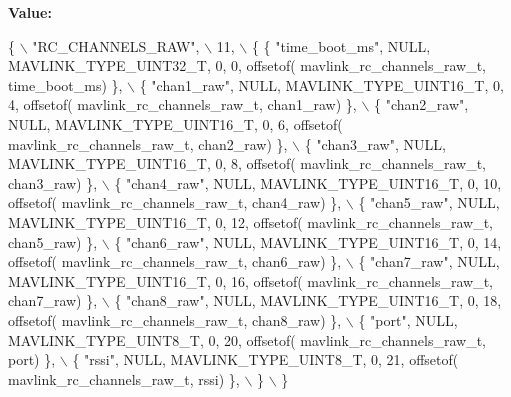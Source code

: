 {\bfseries Value\+:}
\begin{DoxyCode}
\{ \(\backslash\)
    \textcolor{stringliteral}{"RC\_CHANNELS\_RAW"}, \(\backslash\)
    11, \(\backslash\)
    \{  \{ \textcolor{stringliteral}{"time\_boot\_ms"}, NULL, MAVLINK_TYPE_UINT32_T, 0, 0, offsetof(
      mavlink_rc_channels_raw_t, time\_boot\_ms) \}, \(\backslash\)
         \{ \textcolor{stringliteral}{"chan1\_raw"}, NULL, MAVLINK_TYPE_UINT16_T, 0, 4, offsetof(
      mavlink_rc_channels_raw_t, chan1\_raw) \}, \(\backslash\)
         \{ \textcolor{stringliteral}{"chan2\_raw"}, NULL, MAVLINK_TYPE_UINT16_T, 0, 6, offsetof(
      mavlink_rc_channels_raw_t, chan2\_raw) \}, \(\backslash\)
         \{ \textcolor{stringliteral}{"chan3\_raw"}, NULL, MAVLINK_TYPE_UINT16_T, 0, 8, offsetof(
      mavlink_rc_channels_raw_t, chan3\_raw) \}, \(\backslash\)
         \{ \textcolor{stringliteral}{"chan4\_raw"}, NULL, MAVLINK_TYPE_UINT16_T, 0, 10, offsetof(
      mavlink_rc_channels_raw_t, chan4\_raw) \}, \(\backslash\)
         \{ \textcolor{stringliteral}{"chan5\_raw"}, NULL, MAVLINK_TYPE_UINT16_T, 0, 12, offsetof(
      mavlink_rc_channels_raw_t, chan5\_raw) \}, \(\backslash\)
         \{ \textcolor{stringliteral}{"chan6\_raw"}, NULL, MAVLINK_TYPE_UINT16_T, 0, 14, offsetof(
      mavlink_rc_channels_raw_t, chan6\_raw) \}, \(\backslash\)
         \{ \textcolor{stringliteral}{"chan7\_raw"}, NULL, MAVLINK_TYPE_UINT16_T, 0, 16, offsetof(
      mavlink_rc_channels_raw_t, chan7\_raw) \}, \(\backslash\)
         \{ \textcolor{stringliteral}{"chan8\_raw"}, NULL, MAVLINK_TYPE_UINT16_T, 0, 18, offsetof(
      mavlink_rc_channels_raw_t, chan8\_raw) \}, \(\backslash\)
         \{ \textcolor{stringliteral}{"port"}, NULL, MAVLINK_TYPE_UINT8_T, 0, 20, offsetof(
      mavlink_rc_channels_raw_t, port) \}, \(\backslash\)
         \{ \textcolor{stringliteral}{"rssi"}, NULL, MAVLINK_TYPE_UINT8_T, 0, 21, offsetof(
      mavlink_rc_channels_raw_t, rssi) \}, \(\backslash\)
         \} \(\backslash\)
\}
\end{DoxyCode}
\mbox{\label{mavlink__msg__rc__channels__raw_8h_aea3e0ce56bf7665f8dc16bbf5f09d00b}} 
